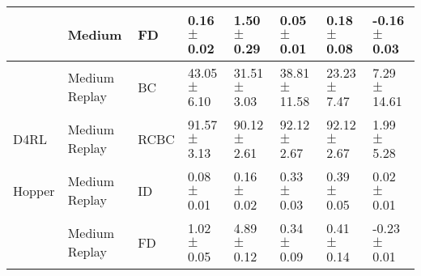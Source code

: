\begin{table*}
\begin{tabular}{l l l l l l l l}
       &        Medium &   FD &   0.16 $\pm$ 0.02 &   1.50 $\pm$ 0.29 &   0.05 $\pm$ 0.01 &   0.18 $\pm$ 0.08 &  \textcolor[rgb]{0.00,0.04,0.00}{-0.16 $\pm$ 0.03} \\
    \midrule
       & Medium Replay &   BC &  43.05 $\pm$ 6.10 &  31.51 $\pm$ 3.03 & 38.81 $\pm$ 11.58 &  23.23 $\pm$ 7.47 &     \textcolor[rgb]{0.0,1.0,0.0}{7.29 $\pm$ 14.61} \\
  D4RL & Medium Replay & RCBC &  91.57 $\pm$ 3.13 &  90.12 $\pm$ 2.61 &  92.12 $\pm$ 2.67 &  92.12 $\pm$ 2.67 &   \textcolor[rgb]{0.00,0.50,0.00}{1.99 $\pm$ 5.28} \\
Hopper & Medium Replay &   ID &   0.08 $\pm$ 0.01 &   0.16 $\pm$ 0.02 &   0.33 $\pm$ 0.03 &   0.39 $\pm$ 0.05 &   \textcolor[rgb]{0.00,0.00,0.00}{0.02 $\pm$ 0.01} \\
       & Medium Replay &   FD &   1.02 $\pm$ 0.05 &   4.89 $\pm$ 0.12 &   0.34 $\pm$ 0.09 &   0.41 $\pm$ 0.14 &  \textcolor[rgb]{0.00,0.07,0.00}{-0.23 $\pm$ 0.01} \\
    \midrule
    \bottomrule
  \end{tabular}
\end{table*}
